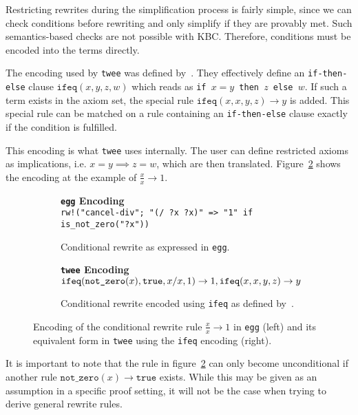 Restricting rewrites during the simplification process is fairly simple, since we can check conditions before rewriting and only simplify if they are provably met. Such semantics-based checks are not possible with KBC. Therefore, conditions must be encoded into the terms directly.

The encoding used by \texttt{twee} was defined by~\cite{ClaessenSmallbone2021}. They effectively define an \texttt{if-then-else} clause $\texttt{ifeq}(x, y , z, w)$ which reads as \texttt{if $x = y$ then $z$ else $w$}. If such a term exists in the axiom set, the special rule $\texttt{ifeq}(x, x , y, z) \to y$ is added. This special rule can be matched on a rule containing an \texttt{if-then-else} clause exactly if the condition is fulfilled. 

This encoding is what \texttt{twee} uses internally. The user can define restricted axioms as implications, i.e. $x=y \implies z = w$, which are then translated. Figure~\ref{fig:ifeq-twee} shows the encoding at the example of $\frac{x}{x} \to 1$. 

\begin{figure}[h]
	\centering
	\begin{subfigure}[t]{0.45\textwidth}
		\textbf{\texttt{egg} Encoding}\\[3pt]
		\texttt{rw!("cancel-div"; "(/ ?x ?x)" => "1" if is\_not\_zero("?x"))}
		\caption{\scriptsize Conditional rewrite as expressed in \texttt{egg}.}
		\label{fig:ifeq-egg}
	\end{subfigure}
	\hfill
	\begin{subfigure}[t]{0.49\textwidth}
		\textbf{\texttt{twee} Encoding}\\[3pt]
		$\displaystyle
		\text{\texttt{ifeq}}(\text{\texttt{not\_zero}}(x), \text{\texttt{true}}, x / x, 1) \to 1,\\
		\text{\texttt{ifeq}}(x, x, y, z) \to y
		$
		\caption{\scriptsize Conditional rewrite encoded using \texttt{ifeq} as defined by~\cite{ClaessenSmallbone2021}.}
		\label{fig:ifeq-twee}
	\end{subfigure}
	
	\caption{Encoding of the conditional rewrite rule $\frac{x}{x} \to 1$ in \texttt{egg} (left) and its equivalent form in \texttt{twee} using the \texttt{ifeq} encoding (right).}
	\label{fig:ifeq-encoding}
\end{figure}


It is important to note that the rule in figure~\ref{fig:ifeq-twee} can only become unconditional if another rule $\texttt{not\_zero}(x) \to \texttt{true}$ exists. While this may be given as an assumption in a specific proof setting, it will not be the case when trying to derive general rewrite rules. 

